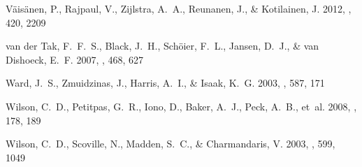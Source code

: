 \begin{thebibliography}{28}
{V{\"a}is{\"a}nen}, P., {Rajpaul}, V., {Zijlstra}, A.~A., {Reunanen}, J., \&
  {Kotilainen}, J. 2012, \mnras, 420, 2209

{van der Tak}, F.~F.~S., {Black}, J.~H., {Sch{\"o}ier}, F.~L., {Jansen}, D.~J.,
  \& {van Dishoeck}, E.~F. 2007, \aap, 468, 627

{Ward}, J.~S., {Zmuidzinas}, J., {Harris}, A.~I., \& {Isaak}, K.~G. 2003, \apj,
  587, 171

{Wilson}, C.~D., {Petitpas}, G.~R., {Iono}, D., {Baker}, A.~J., {Peck}, A.~B.,
  {et~al.} 2008, \apjs, 178, 189

{Wilson}, C.~D., {Scoville}, N., {Madden}, S.~C., \& {Charmandaris}, V. 2003,
  \apj, 599, 1049

\end{thebibliography}




